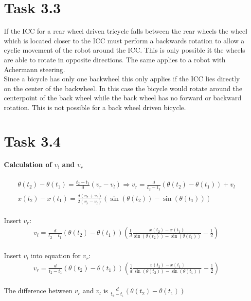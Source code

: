 \documentclass{article}
\begin{document}
	\section{Task 3.3}
	If the ICC for a rear wheel driven tricycle falls between the rear wheels the wheel which is located closer to the ICC must perform a backwards rotation to allow a cyclic movement of the robot around the ICC. This is only possible it the wheels are able to rotate in opposite directions. The same applies to a robot with Achermann steering.\\
	Since a bicycle has only one backwheel this only applies if the ICC lies directly on the center of the backwheel. In this case the bicycle would rotate around the centerpoint of the back wheel while the back wheel has no forward or backward rotation. This is not possible for a back wheel driven bicycle.
	
	\section{Task 3.4}
	\paragraph{Calculation of $v_{l}$ and $v_{r}$}
	\begin{gather}
	\theta(t_2) - \theta(t_1) = \frac{t_2 - t_1}{d}(v_r - v_l) \Rightarrow v_r = \frac{d}{t_2-t_1} (\theta(t_2) - \theta(t_1)) + v_l\\
	x(t_2) - x(t_1) = \frac{d(v_{r} + v_{l})}{2(v_{r} - v_{l})}(\sin(\theta(t_2)) - \sin(\theta(t_1)))
	\end{gather}\\
	Insert $v_r$:
	\begin{gather}
	v_l = \frac{d}{t_2 - t_1}(\theta(t_2) - \theta(t_1))(\frac{1}{d}\frac{x(t_2) - x(t_1)}{\sin(\theta(t_2)) - \sin(\theta(t_1))} - \frac{1}{2})
	\end{gather}\\
	Insert $v_l$ into equation for $v_r$:
	\begin{gather}
	v_r = \frac{d}{t_2 - t_1}(\theta(t_2) - \theta(t_1))(\frac{1}{d}\frac{x(t_2) - x(t_1)}{\sin(\theta(t_2)) - \sin(\theta(t_1))} + \frac{1}{2})
	\end{gather}\\
	The difference between $v_r$ and $v_l$ is $\frac{d}{t_2 - t_1}(\theta(t_2) - \theta(t_1))$
	
\end{document}

